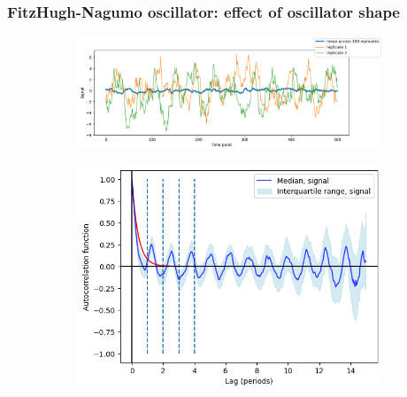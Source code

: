 

\subsubsection{FitzHugh-Nagumo oscillator: effect of oscillator shape}
\label{subsubsec:analysis-characterisation-acf-fhn}


\begin{figure}
  \centering
  \begin{subfigure}[t]{0.6\textwidth}
  \centering
    \includegraphics[width=\linewidth]{fhn_meanplot}
    \caption{
    }
    \label{fig:acf-fhn-gillnoise-ts}
  \end{subfigure}%
  \begin{subfigure}[t]{0.4\textwidth}
  \centering
    \includegraphics[width=\linewidth]{fhn_acf}
    \caption{
    }
    \label{fig:acf-fhn-gillnoise-acf}
  \end{subfigure}


\end{figure}
